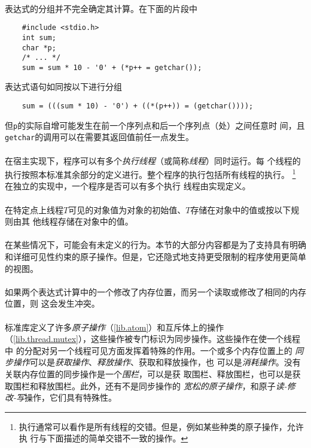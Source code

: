 \paragraph{}
\ex 表达式的分组并不完全确定其计算。在下面的片段中
\begin{lstlisting}
    #include <stdio.h>
    int sum;
    char *p;
    /* ... */
    sum = sum * 10 - '0' + (*p++ = getchar());
\end{lstlisting}
表达式语句如同按以下进行分组
\begin{lstlisting}
    sum = (((sum * 10) - '0') + ((*(p++)) = (getchar())));
\end{lstlisting}
但\texttt{p}的实际自增可能发生在前一个序列点和后一个序列点（\tm{;}处）之间任意时
间，且\texttt{getchar}的调用可以在需要其返回值前任一点发生。


\paragraph{}
在宿主实现下，程序可以有多个\textit{执行线程}（或简称\textit{线程}）同时运行。每
个线程的执行按照本标准其余部分的定义进行。整个程序的执行包括所有线程的执行。
\footnote{执行通常可以看作是所有线程的交错。但是，例如某些种类的原子操作，允许执
行与下面描述的简单交错不一致的操作。} 在独立的实现中，一个程序是否可以有多个执行
线程由实现定义。

\paragraph{}
在特定点上线程$T$可见的对象值为对象的初始值、$T$存储在对象中的值或按以下规则由其
他线程存储在对象中的值。

\paragraph{}
\notes 在某些情况下，可能会有未定义的行为。本节的大部分内容都是为了支持具有明确
和详细可见性约束的原子操作。但是，它还隐式地支持更受限制的程序使用更简单的视图。

\paragraph{}
如果两个表达式计算中的一个修改了内存位置，而另一个读取或修改了相同的内存位置，则
这会发生冲突。

\paragraph{}
标准库定义了许多\textit{原子操作}（\ref{lib.atom}）和互斥体上的操作
（\ref{lib.thread.mutex}），这些操作被专门标识为同步操作。这些操作在使一个线程中
的分配对另一个线程可见方面发挥着特殊的作用。一个或多个内存位置上的
\textit{同步操作}可以是\textit{获取操作}、\textit{释放操作}、获取和释放操作，也
可以是\textit{消耗操作}。没有关联内存位置的同步操作是一个\textit{围栏}，可以是获
取围栏、释放围栏，也可以是获取围栏和释放围栏。此外，还有不是同步操作的
\textit{宽松的原子操作}，和原子\textit{读-修改-写}操作，它们具有特殊性。

